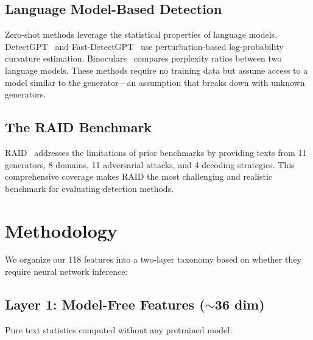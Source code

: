 \documentclass[sigconf,nonacm]{acmart}
\begin{document}
\subsection{Language Model-Based Detection}

Zero-shot methods leverage the statistical properties of language models. DetectGPT~\cite{mitchell2023detectgpt} and Fast-DetectGPT~\cite{bao2024fast} use perturbation-based log-probability curvature estimation. Binoculars~\cite{hans2024binoculars} compares perplexity ratios between two language models. These methods require no training data but assume access to a model similar to the generator---an assumption that breaks down with unknown generators.

\subsection{The RAID Benchmark}

RAID~\cite{dugan2024raid} addresses the limitations of prior benchmarks by providing texts from 11 generators, 8 domains, 11 adversarial attacks, and 4 decoding strategies. This comprehensive coverage makes RAID the most challenging and realistic benchmark for evaluating detection methods.

\section{Methodology}

We organize our 118 features into a two-layer taxonomy based on whether they require neural network inference:

\subsection{Layer 1: Model-Free Features ($\sim$36 dim)}

Pure text statistics computed without any pretrained model:
\end{document}
